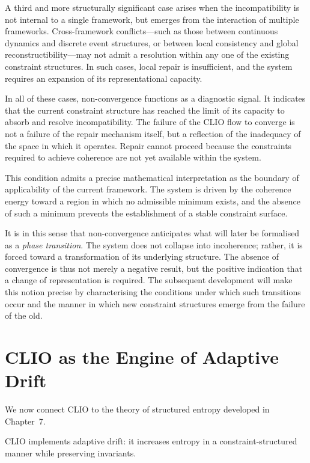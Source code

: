 \documentclass[11pt,openany]{book}
\begin{document}
A third and more structurally significant case arises when
the incompatibility is not internal to a single framework,
but emerges from the interaction of multiple frameworks.
Cross-framework conflicts—such as those between continuous
dynamics and discrete event structures, or between local
consistency and global reconstructibility—may not admit a
resolution within any one of the existing constraint
structures.  In such cases, local repair is insufficient,
and the system requires an expansion of its representational
capacity.

In all of these cases, non-convergence functions as a
diagnostic signal.  It indicates that the current
constraint structure has reached the limit of its capacity
to absorb and resolve incompatibility.  The failure of the
CLIO flow to converge is not a failure of the repair
mechanism itself, but a reflection of the inadequacy of the
space in which it operates.  Repair cannot proceed because
the constraints required to achieve coherence are not yet
available within the system.

This condition admits a precise mathematical interpretation
as the boundary of applicability of the current framework.
The system is driven by the coherence energy toward a region
in which no admissible minimum exists, and the absence of
such a minimum prevents the establishment of a stable
constraint surface.

It is in this sense that non-convergence anticipates what
will later be formalised as a \emph{phase transition}.  The
system does not collapse into incoherence; rather, it is
forced toward a transformation of its underlying structure.
The absence of convergence is thus not merely a negative
result, but the positive indication that a change of
representation is required.  The subsequent development will
make this notion precise by characterising the conditions
under which such transitions occur and the manner in which
new constraint structures emerge from the failure of the
old.

\section{CLIO as the Engine of Adaptive Drift}
\label{sec:adaptive}

We now connect CLIO to the theory of structured entropy
developed in Chapter~7.

\begin{proposition}
CLIO implements adaptive drift: it increases entropy in a
constraint-structured manner while preserving invariants.
\end{proposition}
\end{document}
